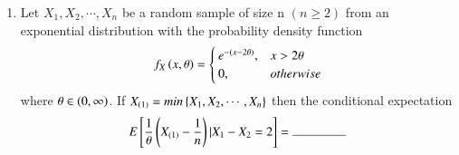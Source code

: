 \begin{enumerate}[label=\thesection.\arabic*.,ref=\thesection.\theenumi]
\\
\solution
  
%
\item Let $X_1,X_2,\cdots,X_n$ be a random sample of size n $(n\ge2)$ from an exponential distribution with the probability density function
\begin{align}
f_X\left(x,\theta\right)=
\begin{cases}
e^{-(x-2\theta)}, & x>2\theta
\\
0, & otherwise
\end{cases}
\end{align}
where $\theta\in\left(0,\infty\right)$. If $X_{(1)}=min\left\{X_1,X_2,\cdots,X_n\right\}$ then the conditional expectation 
\begin{align}
     \nonumber   \mean{\frac{1}{\theta}\brak{X_{(1)}-\frac{1}{n}}|X_1-X_2=2}=\rule{1.5cm}{0.15mm}
\end{align}
\solution 
  
 

\end{enumerate}